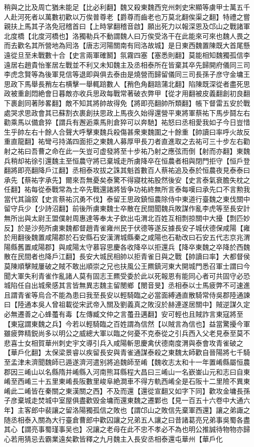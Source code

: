 稍與之比及周亡猶未能足【比必利翻】魏又殺東魏西兖州刺史宋顯等虜甲士萬五千人赴河死者以萬數初歡以万俟普尊老【爵尊而齒老也万莫北翻俟渠之翻】特禮之嘗親扶上馬其子洛免冠稽首曰【上時掌翻稽音啟】願出死力以報深恩及邙山之戰諸軍北度橋【北度河橋也】洛獨勒兵不動謂魏人曰万俟受洛干在此能來可來也魏人畏之而去歡名其所營地為囘洛【唐志河陽關南有囘洛故城】是日東西魏置陳既大首尾懸遠從旦至未戰數十合【史言兩軍確鬭】氛霧四塞【塞悉則翻】莫能相知魏獨孤信李遠居右趙貴怡峯居左戰並不利又未知魏主及丞相泰所在皆棄其卒先歸開府儀同三司李虎念賢等為後軍見信等退即與俱去泰由是燒營而歸留儀同三司長孫子彦守金墉王思政下馬舉長矟左右横擊一舉輒踣數人【矟色角翻踣蒲北翻】陷陳既深從者盡死思政被重創悶絶會日暮敵亦收兵思政每戰常著破衣弊甲【從才用翻被皮義翻創初良翻下裹創同著陟畧翻】敵不知其將帥故得免【將即亮翻帥所類翻】帳下督雷五安於戰處哭求思政會其已蘇割衣裹創扶思政上馬夜久始得還營平東將軍蔡祐下馬步鬪左右勸乘馬以備倉猝【謂兵有邂逅乘馬則倉猝可以奔馳】祐怒曰丞相愛我如子今日豈惜生乎帥左右十餘人合聲大呼擊東魏兵殺傷甚衆東魏圍之十餘重【帥讀曰率呼火故反重直龍翻】祐彎弓持滿四面拒之東魏人募厚甲長刀者直進取之去祐可三十步左右勸射之祐曰吾曹之命在此一矢豈可虚發將至十步祐乃射之應弦而倒【射而亦翻】東魏兵稍却祐徐引還魏主至恒農守將已棄城走所虜降卒在恒農者相與閉門拒守【恒戶登翻將即亮翻降戶江翻】丞相泰攻拔之誅其魁首數百人蔡祐追及泰於恒農夜見泰泰曰承先【蔡祐字承先】爾來吾無憂矣泰驚不得寢枕祐股然後安【史言泰氣衰膽失枕之任翻】祐每從泰戰常為士卒先戰還諸將皆争功祐終無所言泰每嘆曰承先口不言勲我當代其論叙【史言蔡祐沉勇不伐】泰留王思政鎮恒農除侍中東道行臺魏之東伐關中留守兵少【少詩沼翻】前後所虜東魏士卒散在民間聞魏兵敗謀作亂李虎等至長安計無所出與太尉王盟僕射周惠達等奉太子欽出屯渭北百姓互相剽掠關中大擾【剽匹妙反】於是沙苑所虜東魏都督趙青雀雍州民于伏德等遂反據長安子城伏德保咸陽【雍於用翻後魏置咸陽郡於石安縣石安漢渭城縣秦之咸陽也石勒改曰石安五代志京兆渭陽縣舊置咸陽郡】與咸陽太守慕容思慶各收降卒以拒還兵【降卒東魏之卒降於西魏散在民間者也降戶江翻】長安大城民相帥以拒青雀日與之戰【帥讀曰率】大都督侯莫陳順擊賊屢破之賊不敢出順崇之兄也扶風公王羆鎮河東大開城門悉召軍士謂曰今聞大軍失利青雀作亂諸人莫有固志王羆受委於此以死報恩有能同心者可共固守必恐城陷任自出城衆感其言皆無異志魏主留閿鄉【閿音旻】丞相泰以士馬疲弊不可速進且謂青雀等烏合不能為患曰我至長安以輕騎臨之必當面縛通直散騎常侍吳郡陸通諫曰【陸通本吳人曾祖載從宋武帝入關及劉義真之敗沒於赫連遂居關中】賊逆謀久定必無遷善之心蜂蠆有毒【左傳臧文仲之言蠆丑邁翻】安可輕也且賊詐言東寇將至【東寇謂東魏之兵】今若以輕騎臨之百姓謂為信然【以賊言為信也】益當驚擾今軍雖疲弊精鋭尚多以明公之威總大軍以臨之何憂不克泰從之引兵西入父老見泰至莫不悲喜士女相賀華州刺史宇文導引兵入咸陽斬思慶禽伏德南度渭與泰會攻青雀破之【華戶化翻】太保梁景睿以疾留長安與青雀通謀泰殺之東魏太師歡自晉陽將七千騎至孟津未濟聞魏師已遁遂濟河遣别將追魏師至崤【魏收志太和十一年置崤縣屬恒農郡因三崤山以名縣隋并崤縣入河南熊耳縣程大昌曰三崤山一名嶔崟山元和志曰自東崤至西崤三十五里東崤長阪數里峻阜絶澗車不得方軌西崤全是石阪十二里險不異東崤此二崤皆在秦關之東漢關之西】不及而還【還從宣翻又如字下同】歡攻金墉長孫子彦棄城走焚城中室屋俱盡歡毁金墉而還東魏之遷鄴也【見一百五十六卷中大通六年】主客郎中裴讓之留洛陽獨孤信之敗也【謂邙山之敗信先棄軍西還】讓之弟諏之随丞相泰入關為大行臺倉曹郎中歡囚讓之兄弟五人讓之曰昔諸葛亮兄弟事吳蜀各盡其心【謂亮事蜀瑾事吴也】况讓之老母在此不忠不孝必不為也明公推誠待物物亦歸心若用猜忌去霸業遠矣歡皆釋之九月魏主入長安丞相泰還屯華州【華戶化